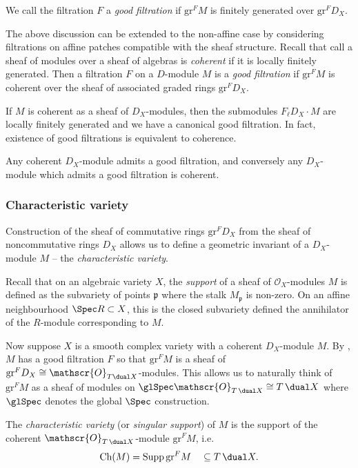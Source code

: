 We call the filtration $F$ a \emph{good filtration} if  $\text{gr}^FM$ is
finitely generated over $\text{gr}^F D_X$. 

The above discussion can be extended to the non-affine case by considering
filtrations on affine patches compatible with the sheaf structure. Recall that
call a sheaf of modules over a sheaf of algebras is \emph{coherent} if it is
locally finitely generated. Then a filtration \(F\) on a \(D\)-module \(M\) is a
\textit{good filtration} if $\text{gr}^FM$ is coherent over the sheaf of
associated graded rings $\text{gr}^F D_X$. 

If \(M\) is coherent as a sheaf of $D_X$-modules, then the submodules \(F_\ell
D_X\cdot M\) are locally finitely generated and we have a canonical good
filtration. In fact, existence of good filtrations is equivalent to coherence.

\begin{theorem}\label{thm:goodfiltration}
    Any coherent $D_X$-module admits a good filtration, and conversely any
    $D_X$-module which admits a good filtration is coherent.
\end{theorem}

\subsubsection{Characteristic variety}

Construction of the sheaf of commutative rings $\text{gr}^FD_X$ from the sheaf
of noncommutative rings $D_X$ allows us to define a geometric invariant of a
$D_X$-module $M$ -- the \emph{characteristic variety}. 

Recall that on an algebraic variety \(X\), the \textit{support} of a sheaf of
\(\mathscr{O}_X\)-modules \(M\) is defined as the subvariety of
points \(\mathfrak{p}\) where the stalk \(M_\mathfrak{p}\) is non-zero. On an
affine neighbourhood \(\Spec R \subset X\), this is the closed subvariety
defined the annihilator of the \(R\)-module corresponding to \(M\).

Now suppose \(X\) is a smooth complex variety with a coherent $D_X$-module \(M\). By
, \(M\) has a good filtration $F$ so that
\(\text{gr}^FM\) is a sheaf of \(\text{gr}^FD_X\cong \mathscr{O}_{T\dual
X}\)-modules. This allows us to naturally think of \(\text{gr}^FM\) as a sheaf
of modules on \(\glSpec \mathscr{O}_{T\,\dual X} \cong T\,\dual X\) where
\(\glSpec\) denotes the global \(\Spec\) construction. 
\begin{definition} 
    The \emph{characteristic variety} (or \emph{singular support}) of
    $M$ is the support of the coherent $\mathscr{O}_{T\,\dual X}$-module
    $\text{gr}^F M$, i.e.\  
    \[\text{Ch}(M) = \text{Supp}\,\text{gr}^F M \quad \subseteq T\,\dual X.\]
\end{definition}

